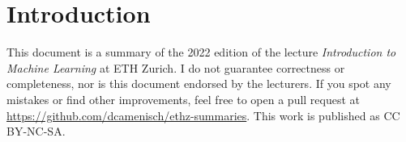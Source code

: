 \section{Introduction}

This document is a summary of the 2022 edition of the lecture \textit{Introduction to Machine Learning} at ETH Zurich. I do not guarantee correctness or completeness, nor is this document endorsed by the lecturers. If you spot any mistakes or find other improvements, feel free to open a pull request at \url{https://github.com/dcamenisch/ethz-summaries}. This work is published as CC BY-NC-SA.
\begin{center}
	\ccbyncsa
\end{center}
